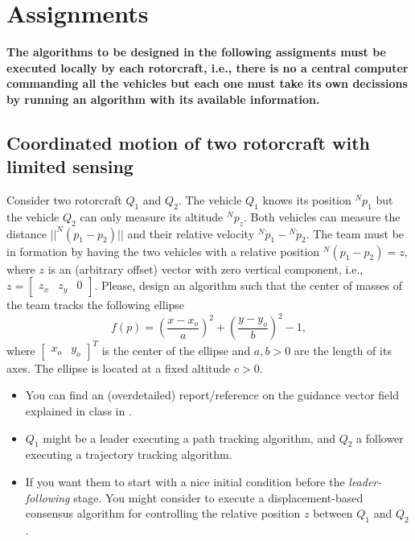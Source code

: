 \documentclass[a4paper, onecolumn]{ieeeconf}
\begin{document}
\section{Assignments}
\label{sec: asi}

\textbf{The algorithms to be designed in the following assigments must be executed locally by each rotorcraft, i.e., there is no a central computer commanding all the vehicles but each one must take its own decissions by running an algorithm with its available information.}
\subsection{Coordinated motion of two rotorcraft with limited sensing}
Consider two rotorcraft $Q_1$ and $Q_2$. The vehicle $Q_1$ knows its position $^Np_1$ but the vehicle $Q_2$ can only measure its altitude $^Np_z$. Both vehicles can measure the distance $||^N(p_1 - p_2)||$ and their relative velocity $^N\dot p_1 - {^N\dot p_2}$. The team must be in formation by having the two vehicles with a relative position $^N(p_1 - p_2) = z$, where $z$ is an (arbitrary offset) vector with zero vertical component, i.e., $z = \begin{bmatrix}z_x & z_y & 0\end{bmatrix}$. Please, design an algorithm such that the center of masses of the team tracks the following ellipse
\begin{equation}
	f(p) = \left(\frac{x-x_o}{a}\right)^2 + \left(\frac{y-y_o}{b}\right)^2 - 1,
\end{equation}
where $\begin{bmatrix}x_o & y_o\end{bmatrix}^T$ is the center of the ellipse and $a,b > 0$ are the length of its axes. The ellipse is located at a fixed altitude $c > 0$. 
	
\begin{itemize}
\item  You can find an (overdetailed) report/reference on the guidance vector field explained in class in \cite{icra17}.
\item $Q_1$ might be a leader executing a path tracking algorithm, and $Q_2$ a follower executing a trajectory tracking algorithm.
\item If you want them to start with a nice initial condition before the \emph{leader-following} stage. You might consider to execute a displacement-based consensus algorithm for controlling the relative position $z$ between $Q_1$ and $Q_2$.
\end{itemize}
\end{document}
